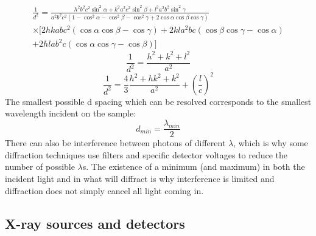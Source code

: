 \begin{multline}
    \frac{1}{d^2}=\frac{h^2b^2c^2\sin^2{\alpha}+k^2a^2c^2\sin^2{\beta}+l^2a^2b^2\sin^2{\gamma}}{a^2b^2c^2(1-\cos^2{\alpha}-\cos^2{\beta}-\cos^2{\gamma}+2\cos{\alpha}\cos{\beta}\cos{\gamma})}\\\times[2hkabc^2(\cos{\alpha}\cos{\beta}-\cos{\gamma})+2kla^2bc(\cos{\beta}\cos{\gamma}-\cos{\alpha})\\+2hlab^2c(\cos{\alpha}\cos{\gamma}-\cos{\beta})]
    \label{latticeplanespacinggeneral}
    \end{multline}
\begin{equation}
    \frac{1}{d^2}=\frac{h^2+k^2+l^2}{a^2}
    \label{latticeplanespacingcubic}
\end{equation}
\begin{equation}
    \frac{1}{d^2}=\frac{4}{3}\frac{h^2+hk^2+k^2}{a^2}+\left(\frac{l}{c}\right)^2
    \label{latticeplanespacinghexagonal}
\end{equation}
The smallest possible d spacing which can be resolved corresponds to the smallest wavelength incident on the sample:
\begin{equation}
    d_{min}=\frac{\lambda_{min}}{2}
    \label{minspacing}
\end{equation}
There can also be interference between photons of different $\lambda$, which is why some diffraction techniques use filters and specific detector voltages to reduce the number of possible $\lambda$s. The existence of a minimum (and maximum) in both the incident light and in what will diffract is why interference is limited and diffraction does not simply cancel all light coming in.
\subsection{X-ray sources and detectors}
